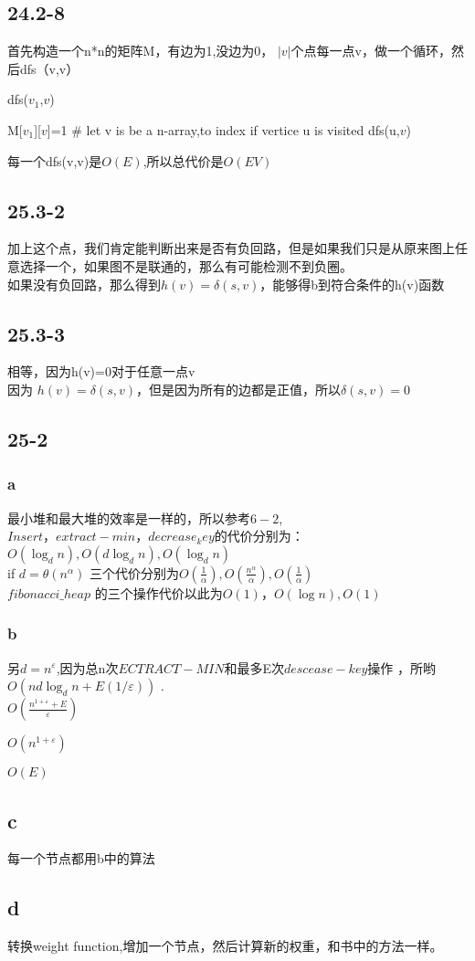 \documentclass[a4paper,UTF8]{article}
\theoremstyle{definition}
\begin{document}
 \subsection*{24.2-8}

 首先构造一个n*n的矩阵M，有边为1,没边为0，
$|v|$个点每一点v，做一个循环，然后dfs（v,v）
\begin{algorithm}[h]

  \caption{dfs($v_1$,$v$)}
  \begin{algorithmic}[1]
   \item M[$v_1$][$v$]=1
          \# let v is be a n-array,to index if vertice u is visited
          \State dfs(u,$v$)
        \EndIf
  \EndFor
  \end{algorithmic}
\end{algorithm}
每一个dfs(v,v)是$O(E)$,所以总代价是$O(EV)$

\subsection*{25.3-2}
加上这个点，我们肯定能判断出来是否有负回路，但是如果我们只是从原来图上任意选择一个，如果图不是联通的，那么有可能检测不到负圈。\\
如果没有负回路，那么得到$h(v)=\delta (s,v)$，能够得b到符合条件的h(v)函数
\subsection*{25.3-3}
相等，因为h(v)=0对于任意一点v\\
因为 $h(v)=\delta (s,v)$，但是因为所有的边都是正值，所以$\delta (s,v)=0$
\subsection*{25-2}
\subsubsection*{a}
最小堆和最大堆的效率是一样的，所以参考$6-2$, $Insert，extract-min，decrease_key$的代价分别为：
$O(\log_{d}{n}),O(d\log_{d}{n}),O(\log_{d}{n})$\\
if $d=\theta(n^{\alpha})$ 三个代价分别为$O(\frac{1}{\alpha}),O(\frac{n^{\alpha}}{\alpha}),O(\frac{1}{\alpha})$\\
$fibonacci\_heap$ 的三个操作代价以此为$O(1)，O(\log{n}),O(1)$
\subsubsection*{b}
另$d=n^{\varepsilon }$,因为总n次$ECTRACT-MIN$和最多E次$descease-key$操作 ，所哟
$O(nd\log_{d}{n}+E(1/\varepsilon))$
.\\
$O(\frac{n^{1+ \varepsilon }+E}{\varepsilon})$

$O(n^{1+\varepsilon})$

$O(E)$

\subsection*{c}
每一个节点都用b中的算法
\subsection*{d}
转换weight function,增加一个节点，然后计算新的权重，和书中的方法一样。
\end{document}
